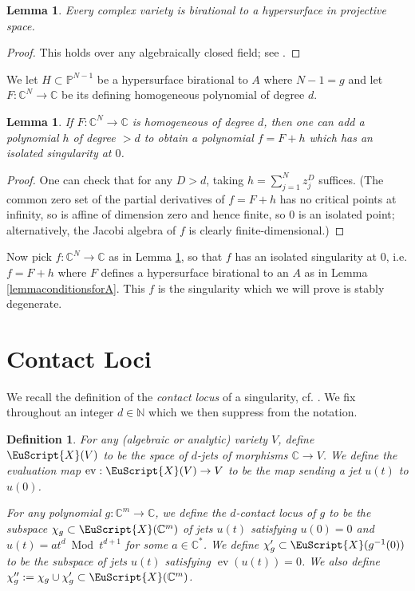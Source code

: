 \documentclass[11pt]{amsart}
\newtheorem{defn}[thm]{Definition}
\newtheorem{lemma}[thm]{Lemma}
\newcommand{\scrX}{\EuScript{X}}
\newcommand{\bC}{\mathbb{C}}
\newcommand{\bN}{\mathbb{N}}
\newcommand{\bP}{\mathbb{P}}
\numberwithin{equation}{section}
\newcommand{\C}{\mathbb C}
\newcommand{\ev}{\operatorname{ev}}
\newcommand{\Mod}{\operatorname{Mod}}
\begin{document}
\begin{lemma}
	Every complex variety is birational to a hypersurface in projective space.
\end{lemma}

\begin{proof} This holds over any algebraically closed field; see \cite[I.4.9]{Hartshorne}. \end{proof}

We let $H \subset \bP^{N-1}$ be a hypersurface birational to $A$ where $N-1=g$ and let $F : \bC^N \to \C$ be its defining homogeneous polynomial of degree $d$.

\begin{lemma}\label{lem:add to make isolated}
	If $F: \bC^N \to \bC$ is homogeneous of degree $d$, then one can add a polynomial $h$ of degree $>d$ to obtain a polynomial $f = F + h$ which has an isolated singularity at $0$.
\end{lemma}

\begin{proof}
	One can check that for any $D > d$, taking $h = \sum_{j=1}^N z_j^{D}$ suffices.  (The common zero set of the partial derivatives of $f=F+h$ has no critical points at infinity, so is affine of dimension zero and hence finite, so $0$ is an isolated point; alternatively, the Jacobi algebra of $f$ is clearly finite-dimensional.)
\end{proof}

Now pick $f : \bC^N \to \bC$  as in Lemma \ref{lem:add to make isolated}, so that $f$ has an isolated singularity at $0$, i.e. $f = F + h$ where $F$ defines a hypersurface birational to an $A$ as in Lemma \ref{lemmaconditionsforA}. This $f$ is the singularity which we will prove is stably degenerate.


\section{Contact Loci} \label{defnofcontactloci}

We recall the definition of the \emph{contact locus} of a singularity, cf. \cite{ELM}. We fix throughout an integer $d \in \bN$ which we then suppress from the notation.


\begin{defn}  \label{defnmodifiedcontactlocus}
	For any (algebraic or analytic) variety $V$, define $\scrX(V)$ to be the space of $d$-jets of morphisms $\bC \to V$.
	We define the \emph{evaluation map} $\ev : \scrX(V) \to V$ to be the map sending a jet $u(t)$ to $u(0)$.


	For any polynomial $g : \C^m \to \C$, we define the \emph{$d$-contact locus of $g$} to be the subspace $\chi_g \subset \scrX(\bC^m)$ of jets $u(t)$ satisfying $u(0) = 0$ and $u(t) = a t^d \ \Mod \ t^{d+1}$ for some $a \in \bC^*$.
	We define
	$\chi'_g \subset \scrX(g^{-1}(0))$ to be the subspace of jets
	$u(t)$ satisfying $\ev(u(t))=0$.
	We also define $\chi''_g := \chi_g \cup \chi'_g \subset \scrX(\bC^m)$.
\end{defn}
\end{document}
